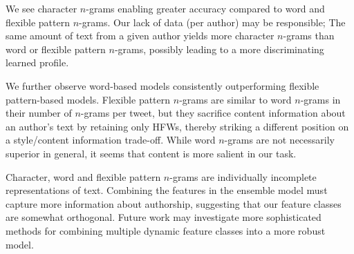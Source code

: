 \documentclass[twocolumn,10pt]{article}
\begin{document}
We see character $n$-grams enabling greater accuracy compared to word
and flexible pattern $n$-grams.
Our lack of data (per author) may be responsible;
The same amount of text from a given author yields more character $n$-grams
than word or flexible pattern $n$-grams, possibly leading to a more
discriminating learned profile.

We further observe word-based models consistently outperforming
flexible pattern-based models. Flexible pattern $n$-grams are similar to
word $n$-grams in their number of $n$-grams per tweet, but they
sacrifice content information about an author's text by retaining only HFWs,
thereby striking a different position on a style/content information
trade-off. 
While word $n$-grams are not necessarily superior in general, it seems
that content is more salient in our task.

Character, word and flexible pattern $n$-grams are individually
incomplete representations of text.
Combining the features in the ensemble model must capture more
information about authorship, suggesting that our feature classes
are somewhat orthogonal.
Future work may investigate more sophisticated methods for
combining multiple dynamic feature classes into a more robust model. 




\printbibliography

\end{document}
